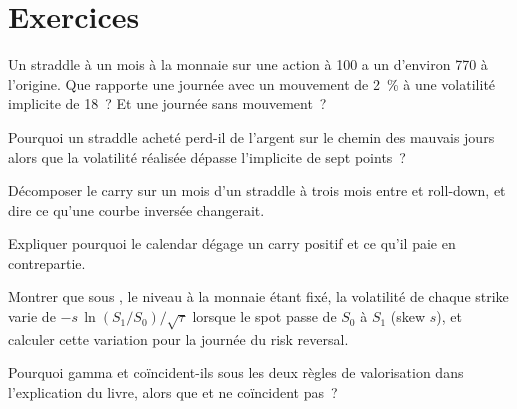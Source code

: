 \section{Exercices}

\begin{exercise}[$\star$]\label{exo:dv:trading-volatility:1}
Un straddle à un mois à la monnaie sur une action à 100 a un  d'environ 770 à l'origine. Que rapporte une journée avec un mouvement de 2~\% à une
volatilité implicite de 18~? Et une journée sans mouvement~?
\end{exercise}

\begin{exercise}[$\star$]\label{exo:dv:trading-volatility:2}
Pourquoi un straddle acheté perd-il de l'argent sur le chemin des mauvais jours alors que la volatilité réalisée dépasse l'implicite de sept points~?
\end{exercise}

\begin{exercise}[$\star$]\label{exo:dv:trading-volatility:3}
Décomposer le carry sur un mois d'un straddle à trois mois entre  et roll-down, et dire ce qu'une courbe inversée changerait.
\end{exercise}

\begin{exercise}[$\star\star$]\label{exo:dv:trading-volatility:4}
Expliquer pourquoi le calendar dégage un carry positif et ce qu'il paie en contrepartie.
\end{exercise}

\begin{exercise}[$\star\star$]\label{exo:dv:trading-volatility:5}
Montrer que sous , le niveau à la monnaie étant fixé, la volatilité de chaque strike varie de $-s\,\ln(S_1/S_0)/\sqrt\tau$ lorsque le spot
passe de $S_0$ à $S_1$ (skew $s$), et calculer cette variation pour la journée du risk reversal.
\end{exercise}

\begin{exercise}[$\star\star$]\label{exo:dv:trading-volatility:6}
Pourquoi gamma et  coïncident-ils sous les deux règles de valorisation dans l'explication du livre, alors que  et  ne coïncident pas~?
\end{exercise}

